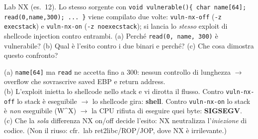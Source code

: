 \question[6]
Lab NX (es.\ 12). Lo stesso sorgente con \lstinline|void vulnerable(){ char name[64]; read(0,name,300); ... }| viene compilato due volte: \lstinline|vuln-nx-off| (\lstinline|-z execstack|) e \lstinline|vuln-nx-on| (\lstinline|-z noexecstack|); si lancia lo \emph{stesso} exploit di shellcode injection contro entrambi.
(a) Perché \lstinline|read(0, name, 300)| è vulnerabile? (b) Qual è l'esito contro i due binari e perché? (c) Che cosa dimostra questo confronto?
\begin{solution}
(a) \lstinline|name[64]| ma \lstinline|read| ne accetta fino a 300: nessun controllo di lunghezza $\to$ overflow che sovrascrive saved EBP e return address.\\
(b) L'exploit inietta lo shellcode nello stack e vi dirotta il flusso. Contro \lstinline|vuln-nx-off| lo stack è eseguibile $\to$ lo shellcode gira: \textbf{shell}. Contro \lstinline|vuln-nx-on| lo stack è \emph{non} eseguibile (W\^{}X) $\to$ la CPU rifiuta di eseguire quei byte: \textbf{SIGSEGV}.\\
(c) Che la \emph{sola} differenza NX on/off decide l'esito: NX neutralizza l'\emph{iniezione} di codice. (Non il riuso: cfr.\ lab ret2libc/ROP/JOP, dove NX è irrilevante.)
\end{solution}
